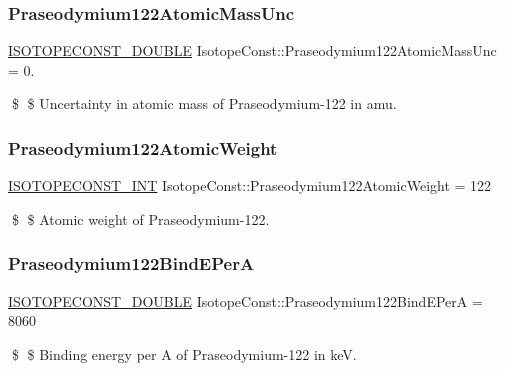 \subsubsection{\texorpdfstring{Praseodymium122\+Atomic\+Mass\+Unc}{Praseodymium122AtomicMassUnc}}
{\footnotesize\ttfamily \mbox{\hyperlink{group___isotope_const-_macros_ga8f45a7272ce02c0b4c65c44636ed719a}{I\+S\+O\+T\+O\+P\+E\+C\+O\+N\+S\+T\+\_\+\+D\+O\+U\+B\+LE}} Isotope\+Const\+::\+Praseodymium122\+Atomic\+Mass\+Unc = 0.}

\$ \$ Uncertainty in atomic mass of Praseodymium-\/122 in amu. \mbox{\label{group___isotope_const-_praseodymium-_pr122_gad7fae3d78bbb6f8effd72b1a90a2cf42}} 
\subsubsection{\texorpdfstring{Praseodymium122\+Atomic\+Weight}{Praseodymium122AtomicWeight}}
{\footnotesize\ttfamily \mbox{\hyperlink{group___isotope_const-_macros_ga5f18360b3e99483a35c32d789e62621c}{I\+S\+O\+T\+O\+P\+E\+C\+O\+N\+S\+T\+\_\+\+I\+NT}} Isotope\+Const\+::\+Praseodymium122\+Atomic\+Weight = 122}

\$ \$ Atomic weight of Praseodymium-\/122. \mbox{\label{group___isotope_const-_praseodymium-_pr122_ga3b9e78b654ba567fa6581c11b864c3f2}} 
\subsubsection{\texorpdfstring{Praseodymium122\+Bind\+E\+PerA}{Praseodymium122BindEPerA}}
{\footnotesize\ttfamily \mbox{\hyperlink{group___isotope_const-_macros_ga8f45a7272ce02c0b4c65c44636ed719a}{I\+S\+O\+T\+O\+P\+E\+C\+O\+N\+S\+T\+\_\+\+D\+O\+U\+B\+LE}} Isotope\+Const\+::\+Praseodymium122\+Bind\+E\+PerA = 8060}

\$ \$ Binding energy per A of Praseodymium-\/122 in keV. \mbox{\label{group___isotope_const-_praseodymium-_pr122_ga4efa71fb6d4332ed43984c1b478f9c1d}} 
